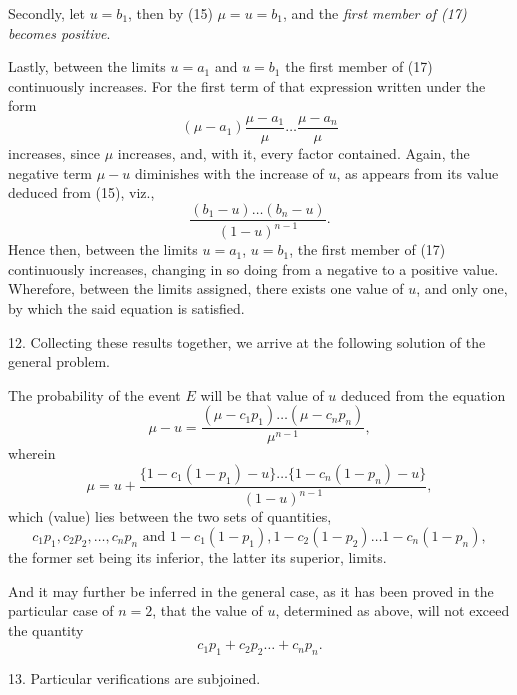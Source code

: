 \documentclass[oneside]{book}
\begin{document}
Secondly, let $u = b_1$, then by (15) $\mu=u=b_1$, and the \emph{first
member of (17) becomes positive}.

Lastly, between the limits $u=a_1$ and $u=b_1$ the first member
of (17) continuously increases. For the first term of that
expression written under the form
\begin{equation*}
(\mu-a_1)\frac{\mu - a_1}{\mu}\dotsc \frac{\mu-a_n}{\mu}
\end{equation*}
increases, since $\mu$ increases, and, with it, every factor contained.
Again, the negative term $\mu-u$ diminishes with the increase of
$u$, as appears from its value deduced from (15), viz.,
\begin{equation*}
\frac{(b_1-u)\dotsc(b_n-u)}{(1-u)^{n-1}}.
\end{equation*}
Hence then, between the limits $u = a_1$, $u = b_1$, the first member
of (17) continuously increases, changing in so doing from a
negative to a positive value. Wherefore, between the limits assigned,
there exists one value of $u$, and only one, by which the said
equation is satisfied.

12. Collecting these results together, we arrive at the
following solution of the general problem.

The probability of the event $E$ will be that value of $u$
deduced from the equation
\begin{equation}\tag{19}
\mu-u=\frac{(\mu-c_1 p_1)\dotsc(\mu-c_n p_n)}{\mu^{n-1}},
\end{equation}
wherein
\begin{equation*}
\mu=u+\frac{\{1-c_1(1-p_1)-u\}\dotsc\{1-c_n(1-p_n)-u\}}{(1-u)^{n-1}},
\end{equation*}
which (value) lies between the two sets of quantities,
\begin{equation*}
c_1 p_1, c_2 p_2, \dotsc, c_n p_n \text{ and }
1-c_1(1-p_1), 1-c_2(1-p_2) \dotsc 1-c_n(1-p_n),
\end{equation*}
the former set being its inferior, the latter its superior, limits.

And it may further be inferred in the general case, as it has
been proved in the particular case of $n = 2$, that the value of $u$,
determined as above, will not exceed the quantity
\begin{equation*}
c_1 p_1 + c_2 p_2 \dotsc + c_n p_n.
\end{equation*}

13. Particular verifications are subjoined.
\end{document}
